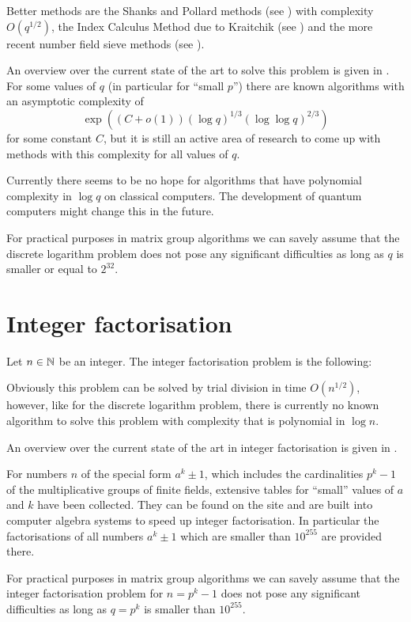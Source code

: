 Better methods are the Shanks and Pollard methods (see 
\cite[Section~3]{odlyzkodlp}) with complexity $O(q^{1/2})$, 
the Index Calculus Method due to
Kraitchik (see \cite{McCurley}) and the more recent number field sieve
methods (see \cite[Section~4]{odlyzkodlp}).

An overview over the current state of the art to solve this problem
is given in \cite{odlyzkodlp}. For some values of $q$ (in particular
for ``small $p$'') there are known
algorithms with an asymptotic complexity of
\[ \exp( (C+o(1)) (\log q)^{1/3} (\log \log q)^{2/3} ) \]
for some constant $C$,
but it is still an active area of research to come up with methods
with this complexity for all values of $q$.

Currently there seems to be no hope for algorithms that have
polynomial complexity in $\log q$ on classical computers. The development
of quantum computers might change this in the future.

For practical purposes in matrix group algorithms 
we can savely assume that the discrete logarithm
problem does not pose any significant difficulties as long as $q$ is
smaller or equal to $2^{32}$.

\section{Integer factorisation}
\label{intfact}

\begin{Problem}
    Let $n \in \mathbb{N}$ be an integer.
    The integer factorisation problem is the following:

    \begin{center}
\end{center}
\end{Problem}

\medskip
Obviously this problem can be solved by trial division in time
$O(n^{1/2})$, however, like for the discrete logarithm problem, 
there is currently no known
algorithm to solve this problem with complexity that is polynomial
in $\log n$.

An overview over the current state of the art in integer factorisation
is given in \cite{gabifaktorisierung}.

For numbers $n$ of the special form $a^k \pm 1$, which includes the
cardinalities $p^k - 1$ of the multiplicative groups of finite fields,
extensive tables for ``small'' values of $a$ and $k$ have been
collected. They can be found on the site \cite{brentfact} and are
built into computer algebra systems to speed up integer factorisation.
In particular the factorisations of all numbers $a^k \pm 1$ which are
smaller than $10^{255}$ are provided there.

For practical purposes in matrix group algorithms 
we can savely assume that the integer factorisation
problem for $n = p^k - 1$ 
does not pose any significant difficulties as long as $q = p^k$ is
smaller than $10^{255}$.


